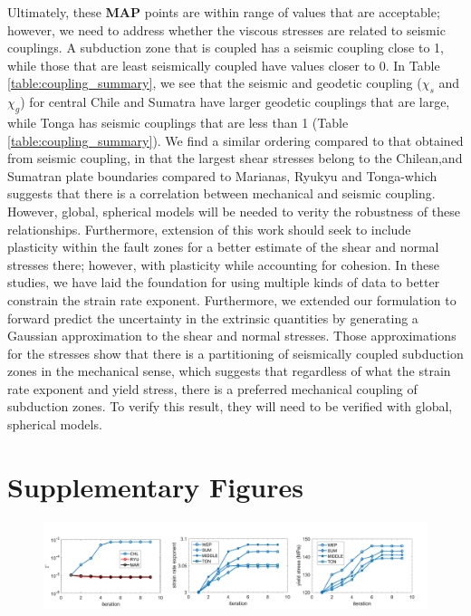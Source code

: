 \documentclass[12pt]{article}
\begin{document}
{   Ultimately, these \textbf{MAP} points are within range of values that are acceptable; however, we need to address whether the viscous stresses are related to seismic couplings. A subduction zone that is coupled has a seismic coupling close to 1, while those that are least seismically coupled have values closer to 0.  In Table \ref{table:coupling_summary}, we see that the seismic and geodetic coupling ($\chi_s$ and $\chi_g$) for central Chile and Sumatra have larger geodetic couplings that are large, while Tonga has seismic couplings that are less than 1 (Table \ref{table:coupling_summary}). We find a similar ordering compared to that obtained from seismic coupling, in that the largest shear stresses belong to the Chilean,and Sumatran plate boundaries compared to Marianas, Ryukyu and Tonga-which suggests that there is a correlation between mechanical and seismic coupling. However, global, spherical models will be needed to verity the robustness of these relationships. Furthermore, extension of this work should seek to include plasticity within the fault zones for a better estimate of the shear and normal stresses there; however, with plasticity while accounting for cohesion. In these studies, we have laid the foundation for using multiple kinds of data to better constrain the strain rate exponent. Furthermore, we extended our formulation to forward predict the uncertainty in the extrinsic quantities by generating a Gaussian approximation to the shear and normal stresses. Those approximations for the stresses show that there is a partitioning of seismically coupled subduction zones in the mechanical sense, which suggests that regardless of what the strain rate exponent and  yield stress, there is a preferred mechanical coupling of subduction zones. To verify this result, they will need to be verified with global, spherical models.
                 








\appendix
\section{Supplementary Figures}
\begin{figure}[H]
\centering

\includegraphics[scale = 0.35]{supp.pdf}%


\end{figure}}
\end{document}
